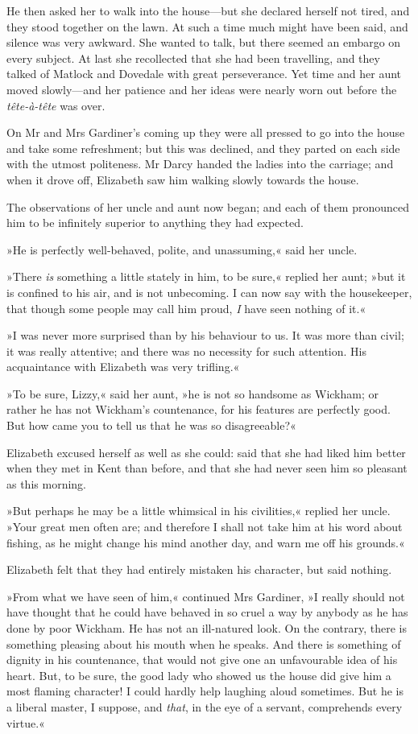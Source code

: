 He then asked her to walk into the house—but she declared herself not tired, and they stood together on the lawn. At such a time much might have been said, and silence was very awkward. She wanted to talk, but there seemed an embargo on every subject. At last she recollected that she had been travelling, and they talked of Matlock and Dovedale with great perseverance. Yet time and her aunt moved slowly—and her patience and her ideas were nearly worn out before the \textit{tête-à-tête} was over.

On Mr and Mrs Gardiner's coming up they were all pressed to go into the house and take some refreshment; but this was declined, and they parted on each side with the utmost politeness. Mr Darcy handed the ladies into the carriage; and when it drove off, Elizabeth saw him walking slowly towards the house.

The observations of her uncle and aunt now began; and each of them pronounced him to be infinitely superior to anything they had expected.

»He is perfectly well-behaved, polite, and unassuming,« said her uncle.

»There \textit{is} something a little stately in him, to be sure,« replied her aunt; »but it is confined to his air, and is not unbecoming. I can now say with the housekeeper, that though some people may call him proud, \textit{I} have seen nothing of it.«

»I was never more surprised than by his behaviour to us. It was more than civil; it was really attentive; and there was no necessity for such attention. His acquaintance with Elizabeth was very trifling.«

»To be sure, Lizzy,« said her aunt, »he is not so handsome as Wickham; or rather he has not Wickham's countenance, for his features are perfectly good. But how came you to tell us that he was so disagreeable?«

Elizabeth excused herself as well as she could: said that she had liked him better when they met in Kent than before, and that she had never seen him so pleasant as this morning.

»But perhaps he may be a little whimsical in his civilities,« replied her uncle. »Your great men often are; and therefore I shall not take him at his word about fishing, as he might change his mind another day, and warn me off his grounds.«

Elizabeth felt that they had entirely mistaken his character, but said nothing.

»From what we have seen of him,« continued Mrs Gardiner, »I really should not have thought that he could have behaved in so cruel a way by anybody as he has done by poor Wickham. He has not an ill-natured look. On the contrary, there is something pleasing about his mouth when he speaks. And there is something of dignity in his countenance, that would not give one an unfavourable idea of his heart. But, to be sure, the good lady who showed us the house did give him a most flaming character! I could hardly help laughing aloud sometimes. But he is a liberal master, I suppose, and \textit{that}, in the eye of a servant, comprehends every virtue.«

